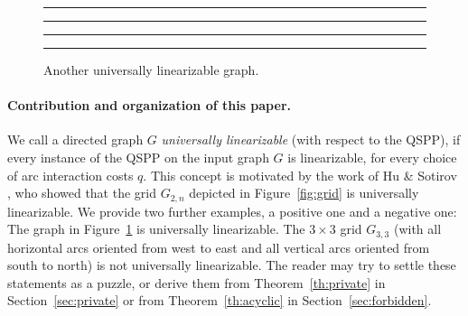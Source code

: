 \begin{figure}[bth]
\hrule\hrule
\medskip
\begin{center}
\end{center}
\vspace{-4ex}
\caption{Another universally linearizable graph.}
\label{fig:example2}
\bigskip
\hrule\hrule
\end{figure}

\paragraph{Contribution and organization of this paper.}
We call a directed graph $G$ \emph{universally linearizable} (with respect to the QSPP), 
if every instance of the QSPP on the input graph $G$ is linearizable, for every choice 
of arc interaction costs $q$.
This concept is motivated by the work of Hu \& Sotirov \cite{huSo2018}, who showed that 
the grid $G_{2,n}$ depicted in Figure~\ref{fig:grid} is universally linearizable.
We provide two further examples, a positive one and a negative one: 
The graph in Figure~\ref{fig:example2} is universally linearizable.
The $3\times3$ grid $G_{3,3}$ (with all horizontal arcs oriented from west to east and 
all vertical arcs oriented from south to north) is not universally linearizable.
The reader may try to settle these statements as a puzzle, or derive them from Theorem~\ref{th:private}
in Section~\ref{sec:private} or from Theorem~\ref{th:acyclic} in Section~\ref{sec:forbidden}.

